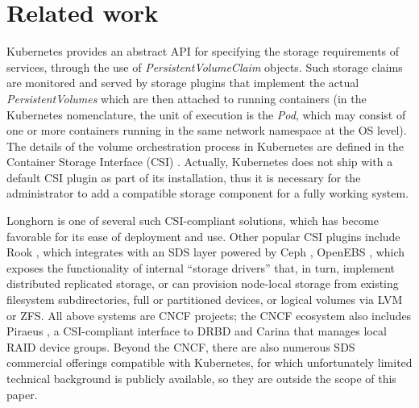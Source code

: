 \section{Related work}


Kubernetes provides an abstract API for specifying the storage requirements of services, through the use of \textit{PersistentVolumeClaim} objects. Such storage claims are monitored and served by storage plugins that implement the actual \textit{PersistentVolumes} which are then attached to running containers (in the Kubernetes nomenclature, the unit of execution is the \textit{Pod}, which may consist of one or more containers running in the same network namespace at the OS level). The details of the volume orchestration process in Kubernetes are defined in the Container Storage Interface (CSI) \cite{csi}. Actually, Kubernetes does not ship with a default CSI plugin as part of its installation, thus it is necessary for the administrator to add a compatible storage component for a fully working system.

Longhorn is one of several such CSI-compliant solutions, which has become favorable for its ease of deployment and use. Other popular CSI plugins include Rook \cite{rook}, which integrates with an SDS layer powered by Ceph \cite{ceph}, OpenEBS \cite{openebs}, which exposes the functionality of internal ``storage drivers'' that, in turn, implement distributed replicated storage, or can provision node-local storage from existing filesystem subdirectories, full or partitioned devices, or logical volumes via LVM or ZFS. All above systems are CNCF projects; the CNCF ecosystem also includes Piraeus \cite{piraeus}, a CSI-compliant interface to DRBD and Carina \cite{carina} that manages local RAID device groups. Beyond the CNCF, there are also numerous SDS commercial offerings compatible with Kubernetes, for which unfortunately limited technical background is publicly available, so they are outside the scope of this paper.


